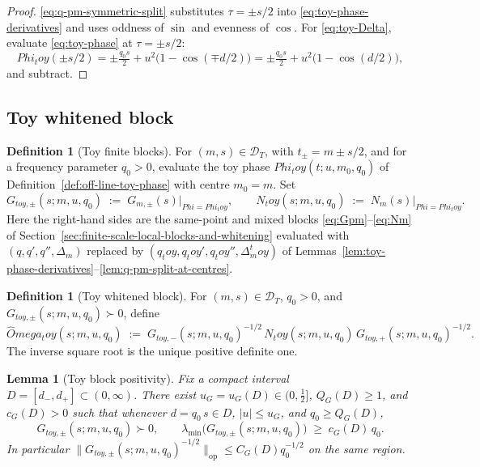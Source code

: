 \documentclass[11pt,a4paper]{amsart}
\def\Omega{Omega}%
\def\Phi{Phi}%
\def\toy{toy}%
\numberwithin{equation}{section}
\theoremstyle{plain}
\newtheorem{lemma}[theorem]{Lemma}
\theoremstyle{definition}
\newtheorem{definition}[theorem]{Definition}
\newcommand{\Om}{\Omega}
\newcommand{\Ph}{\Phi}
\newcommand{\Del}{\Delta}
\newcommand{\toy}{\mathrm{toy}}
\newcommand{\op}{\mathrm{op}}
\begin{document}
\begin{proof}
\eqref{eq:q-pm-symmetric-split} substitutes \(\tau=\pm s/2\) into
\eqref{eq:toy-phase-derivatives} and uses oddness of \(\sin\) and
evenness of \(\cos\).  For \eqref{eq:toy-Delta}, evaluate
\eqref{eq:toy-phase} at \(\tau=\pm s/2\):
\[
\Ph_\toy(\pm s/2)
=\pm\tfrac{q_0 s}{2}
+u^2\bigl(1-\cos(\mp d/2)\bigr)
=\pm\tfrac{q_0 s}{2}
+u^2\bigl(1-\cos(d/2)\bigr),
\]
and subtract.
\end{proof}

\subsection{Toy whitened block}
\label{subsec:toy-whitened-block}

\begin{definition}[Toy finite blocks]
\label{def:toy-finite-blocks}
For \((m,s)\in\mathcal D_T\), with \(t_\pm=m\pm s/2\), and for a
frequency parameter \(q_0>0\), evaluate the toy phase
\(\Ph_\toy(t;u,m_0,q_0)\) of Definition~\ref{def:off-line-toy-phase}
with centre \(m_0=m\).  Set
\begin{equation}
\label{eq:toy-G-N}
G_{\toy,\pm}(s;m,u,q_0)\;:=\;G_{m,\pm}(s)\big|_{\Ph=\Ph_\toy},
\qquad
N_\toy(s;m,u,q_0)\;:=\;N_m(s)\big|_{\Ph=\Ph_\toy}.
\end{equation}
Here the right-hand sides are the same-point and mixed blocks
\eqref{eq:Gpm}--\eqref{eq:Nm} of
Section~\ref{sec:finite-scale-local-blocks-and-whitening} evaluated
with \((q,q',q'',\Del_m)\) replaced by
\((q_\toy,q_\toy',q_\toy'',\Del_m^\toy)\) of
Lemmas~\ref{lem:toy-phase-derivatives}--\ref{lem:q-pm-split-at-centres}.
\end{definition}

\begin{definition}[Toy whitened block]
\label{def:toy-whitened-block}
For \((m,s)\in\mathcal D_T\), \(q_0>0\), and
\(G_{\toy,\pm}(s;m,u,q_0)\succ 0\), define
\begin{equation}
\label{eq:omega-toy}
\widehat\Om_\toy(s;m,u,q_0)
\;:=\;G_{\toy,-}(s;m,u,q_0)^{-1/2}\,N_\toy(s;m,u,q_0)\,G_{\toy,+}(s;m,u,q_0)^{-1/2}.
\end{equation}
The inverse square root is the unique positive definite one.
\end{definition}

\begin{lemma}[Toy block positivity]
\label{lem:toy-block-positivity}
Fix a compact interval \(D=[d_-,d_+]\subset(0,\infty)\).  There exist
\(u_G=u_G(D)\in(0,\tfrac12]\), \(Q_G(D)\ge1\), and \(c_G(D)>0\) such
that whenever \(d=q_0\,s\in D\), \(|u|\le u_G\), and \(q_0\ge Q_G(D)\),
\[
        G_{\toy,\pm}(s;m,u,q_0)\succ 0,
        \qquad
        \lambda_{\min}\bigl(G_{\toy,\pm}(s;m,u,q_0)\bigr)\;\ge\;c_G(D)\,q_0.
\]
In particular \(\|G_{\toy,\pm}(s;m,u,q_0)^{-1/2}\|_{\op}\le C_G(D)q_0^{-1/2}\)
on the same region.
\end{lemma}
\end{document}
